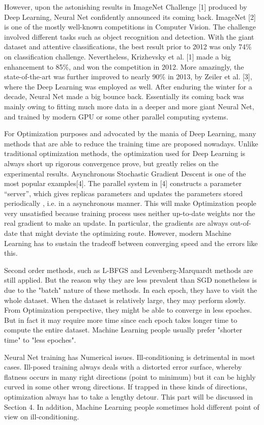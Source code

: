 \documentclass{article} %
\begin{document}
However, upon the astonishing results in ImageNet Challenge [1] produced by Deep Learning, Neural Net confidently announced its coming back. ImageNet [2] is one of the mostly well-known competitions in Computer Vision. The challenge involved different tasks such as object recognition and detection. With the giant dataset and attentive classifications, the best result prior to 2012 was only 74\% on classification challenge. Nevertheless, Krizhevsky et al. [1] made a big enhancement to 85\%, and won the competition in 2012. More amazingly, the state-of-the-art was further improved to nearly 90\% in 2013, by Zeiler et al. [3], where the Deep Learning was employed as well. After enduring the winter for a decade, Neural Net made a big bounce back. Essentially its coming back was mainly owing to fitting much more data in a deeper and more giant Neural Net, and trained by modern GPU or some other parallel computing systems.

For Optimization purposes and advocated by the mania of Deep Learning, many methods that are able to reduce the training time are proposed nowadays. Unlike traditional optimization methods, the optimization used for Deep Learning is always short up rigorous convergence prove, but greatly relies on the experimental results. Asynchronous Stochastic Gradient Descent is one of the most popular examples[4]. The parallel system in [4] constructs a parameter “server”, which gives replicas parameters and updates the parameters stored periodically , i.e. in a asynchronous manner. This will make Optimization people very unsatisfied because training process uses neither up-to-date weights nor the real gradient to make an update. In particular, the gradients are always out-of-date that might deviate the optimizing route. However, modern Machine Learning has to sustain the tradeoff between converging speed and the errors like this.

Second order methods, such as L-BFGS and Levenberg-Marquardt methods are still applied. But the reason why they are less prevalent than SGD nonetheless is due to the "batch" nature of these methods. In each epoch, they have to visit the whole dataset. When the dataset is relatively large, they may perform slowly. From Optimization perspective, they might be able to converge in less epoches. But in fact it may require more time since each epoch takes longer time to compute the entire dataset. Machine Learning people usually prefer "shorter time" to "less epoches".

Neural Net training has Numerical issues. Ill-conditioning is detrimental in most cases. Ill-posed training always deals with a distorted error surface, whereby flatness occurs in many right directions (point to minimum) but it can be highly curved in some other wrong directions. If trapped in these kinds of directions, optimization always has to take a lengthy detour. This part will be discussed in Section 4. In addition, Machine Learning people sometimes hold different point of view on ill-conditioning.
\end{document}
